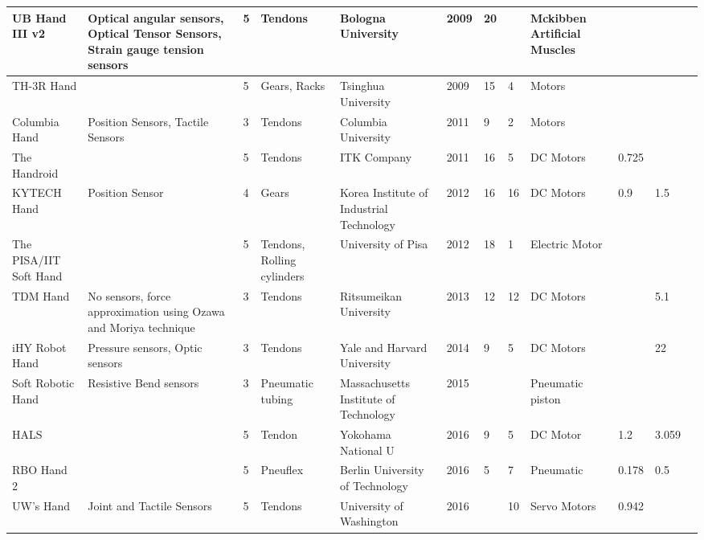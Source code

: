 \documentclass[a4paper, 10pt, conference]{ieeeconf}      %
\begin{document}
\begin{landscape}
\begin{table}[]
\begin{tabular}{p{2cm}p{4cm}lp{2cm}p{2cm}lllp{2cm}lll}
UB Hand III v2 & Optical angular sensors, Optical Tensor Sensors, Strain gauge tension sensors & 5 & Tendons & Bologna University & 2009 & 20 &  & Mckibben Artificial Muscles &  &  &  \\ \hline
TH-3R Hand &  & 5 & Gears, Racks & Tsinghua University & 2009 & 15 & 4 & Motors &  &  &  \\ \hline
Columbia Hand & Position Sensors, Tactile Sensors & 3 & Tendons & Columbia University & 2011 & 9 & 2 & Motors &  &  &  \\ \hline
The Handroid &  & 5 & Tendons & ITK Company & 2011 & 16 & 5 & DC Motors & 0.725 &  &  \\ \hline
KYTECH Hand & Position Sensor & 4 & Gears & Korea Institute of Industrial Technology & 2012 & 16 & 16 & DC Motors & 0.9 & 1.5 &  \\ \hline
The PISA/IIT Soft Hand &  & 5 & Tendons, Rolling cylinders & University of Pisa & 2012 & 18 & 1 & Electric Motor &  &  &  \\ \hline
TDM Hand & No sensors, force approximation using Ozawa and Moriya technique & 3 & Tendons & Ritsumeikan University & 2013 & 12 & 12 & DC Motors &  & 5.1 &  \\ \hline
iHY Robot Hand & Pressure sensors, Optic sensors & 3 & Tendons & Yale and Harvard University & 2014 & 9 & 5 & DC Motors &  & 22 &  \\ \hline
Soft Robotic Hand & Resistive Bend sensors & 3 & Pneumatic tubing & Massachusetts Institute of Technology & 2015 &  &  & Pneumatic piston &  &  &  \\ \hline
HALS &  & 5 & Tendon & Yokohama National U & 2016 & 9 & 5 & DC Motor & 1.2 & 3.059 &  \\ \hline
RBO Hand 2 &  & 5 & Pneuflex & Berlin University of Technology & 2016 & 5 & 7 & Pneumatic & 0.178 & 0.5 &  \\ \hline
UW’s Hand & Joint and Tactile Sensors & 5 & Tendons & University of Washington & 2016 &  & 10 & Servo Motors & 0.942 &  &  \\ \hline
\end{tabular}
\end{table}
\end{landscape}

\listoffigures
\listoftables


\nocite{*}

%
\end{document}

